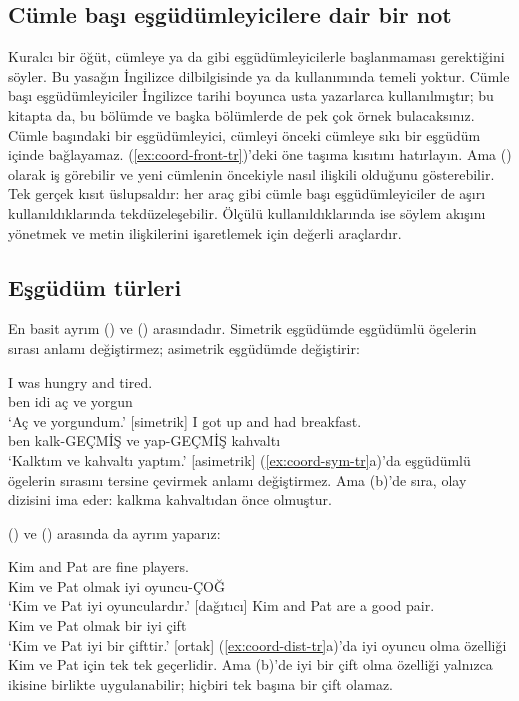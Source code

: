 \subsection{Cümle başı eşgüdümleyicilere dair bir not}

Kuralcı bir öğüt, cümleye  ya da  gibi eşgüdümleyicilerle başlanmaması gerektiğini söyler. Bu yasağın İngilizce dilbilgisinde ya da kullanımında temeli yoktur. Cümle başı eşgüdümleyiciler İngilizce tarihi boyunca usta yazarlarca kullanılmıştır; bu kitapta da, bu bölümde ve başka bölümlerde de pek çok örnek bulacaksınız. Cümle başındaki bir eşgüdümleyici, cümleyi önceki cümleye sıkı bir eşgüdüm içinde bağlayamaz. (\ref{ex:coord-front-tr})'deki öne taşıma kısıtını hatırlayın. Ama  () olarak iş görebilir ve yeni cümlenin öncekiyle nasıl ilişkili olduğunu gösterebilir. Tek gerçek kısıt üslupsaldır: her araç gibi cümle başı eşgüdümleyiciler de aşırı kullanıldıklarında tekdüzeleşebilir. Ölçülü kullanıldıklarında ise söylem akışını yönetmek ve metin ilişkilerini işaretlemek için değerli araçlardır.

\subsection{Eşgüdüm türleri}

En basit ayrım  () ve  () arasındadır. Simetrik eşgüdümde eşgüdümlü ögelerin sırası anlamı değiştirmez; asimetrik eşgüdümde değiştirir:

\ea \label{ex:coord-sym-tr}
    \ea \gll I was hungry and tired.\\
        ben idi aç ve yorgun\\
    \glt `Aç ve yorgundum.' [simetrik]
    \ex \gll I got up and had breakfast.\\
        ben kalk-GEÇMİŞ ve yap-GEÇMİŞ kahvaltı\\
    \glt `Kalktım ve kahvaltı yaptım.' [asimetrik]
    \z
\z
(\ref{ex:coord-sym-tr}a)'da eşgüdümlü ögelerin sırasını tersine çevirmek anlamı değiştirmez. Ama (b)'de sıra, olay dizisini ima eder: kalkma kahvaltıdan önce olmuştur.

 () ve  () arasında da ayrım yaparız:

\ea \label{ex:coord-dist-tr}
    \ea \gll Kim and Pat are fine players.\\
        Kim ve Pat olmak iyi oyuncu-ÇOĞ\\
    \glt `Kim ve Pat iyi oyunculardır.' [dağıtıcı]
    \ex \gll Kim and Pat are a good pair.\\
        Kim ve Pat olmak bir iyi çift\\
    \glt `Kim ve Pat iyi bir çifttir.' [ortak]
    \z
\z
(\ref{ex:coord-dist-tr}a)'da iyi oyuncu olma özelliği Kim ve Pat için tek tek geçerlidir. Ama (b)'de iyi bir çift olma özelliği yalnızca ikisine birlikte uygulanabilir; hiçbiri tek başına bir çift olamaz.

